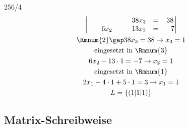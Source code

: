 \begin{exercise}{256/4}
\begin{gather*}
\begin{vmatrix}
      &&&& 38x_3 & = & 38 \\
      && 6x_2 & - & 13x_3 & = & -7
    \end{vmatrix} \\
    \text{\Rmnum{2}} \gap 38x_3 = 38 \rightarrow x_3 = 1 \\
    \text{eingesetzt in \Rmnum{3}} \\
    6x_2 - 13 \cdot 1 = -7 \rightarrow x_2 = 1 \\
    \text{eingesetzt in \Rmnum{1}} \\
    2x_1 - 4 \cdot 1 + 5 \cdot 1 = 3 \rightarrow x_1 = 1 \\
    L = \{(1|1|1)\}
  \end{gather*}
\end{exercise}
\newpage
\subsection{Matrix-Schreibweise}
